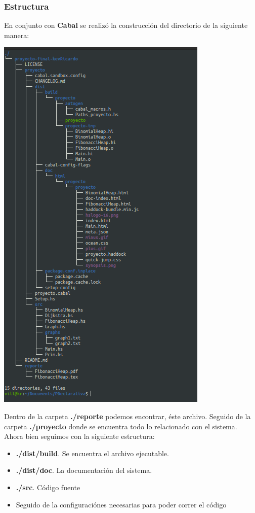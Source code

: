 \documentclass[a4paper, titlepage, 12pt]{article}
\theoremstyle{definition}%
\theoremstyle{Teorema}
\theoremstyle{break}
\begin{document}
\subsubsection*{Estructura}
En conjunto con \textbf{Cabal} se realizó la construcción del directorio de la siguiente manera:
\begin{center}
  \includegraphics[scale=.5]{img/treepath.png}
\end{center}

Dentro de la carpeta \textbf{./reporte} podemos encontrar, éste archivo. Seguido de la carpeta \textbf{./proyecto} donde 
se encuentra todo lo relacionado con el sistema.\\

Ahora bien seguimos con la siguiente estructura:
\begin{itemize}
  \item \textbf{./dist/build}. Se encuentra el archivo ejecutable.
  \item \textbf{./dist/doc}. La documentación del sistema.
  \item \textbf{./src}. Código fuente
  \item Seguido de la configuraciónes necesarias para poder correr el código
\end{itemize}
\end{document}
